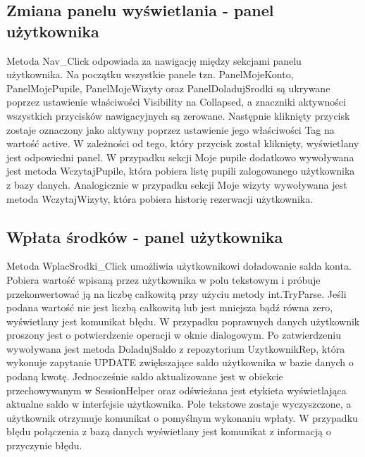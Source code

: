 

\subsection{Zmiana panelu wyświetlania - panel użytkownika}

Metoda Nav\_Click odpowiada za nawigację między sekcjami panelu użytkownika. Na początku wszystkie 
panele tzn. PanelMojeKonto, PanelMojePupile, PanelMojeWizyty oraz PanelDoladujSrodki są ukrywane poprzez 
ustawienie właściwości Visibility na Collapsed, a znaczniki aktywności wszystkich przycisków nawigacyjnych są zerowane. 
Następnie kliknięty przycisk zostaje oznaczony jako aktywny poprzez ustawienie jego właściwości Tag na wartość active. W zależności od 
tego, który przycisk został kliknięty, wyświetlany jest odpowiedni panel. 
W przypadku sekcji Moje pupile dodatkowo wywoływana jest metoda WczytajPupile, która pobiera listę pupili zalogowanego 
użytkownika z bazy danych. Analogicznie w przypadku sekcji Moje wizyty wywoływana jest metoda WczytajWizyty, która pobiera 
historię rezerwacji użytkownika.



\subsection{Wpłata środków - panel użytkownika}

Metoda WplacSrodki\_Click umożliwia użytkownikowi doładowanie salda konta. Pobiera wartość wpisaną przez użytkownika 
w polu tekstowym i próbuje przekonwertować ją na liczbę całkowitą przy użyciu metody int.TryParse. 
Jeśli podana wartość nie jest liczbą całkowitą lub jest mniejsza bądź równa zero, wyświetlany jest komunikat błędu. W przypadku 
poprawnych danych użytkownik proszony jest o potwierdzenie operacji w oknie dialogowym. Po zatwierdzeniu wywoływana jest 
metoda DoladujSaldo z repozytorium UzytkownikRep, która wykonuje zapytanie UPDATE zwiększające saldo 
użytkownika w bazie danych o podaną kwotę. Jednocześnie saldo aktualizowane jest w obiekcie przechowywanym w SessionHelper 
oraz odświeżana jest etykieta wyświetlająca aktualne saldo w interfejsie użytkownika. Pole tekstowe zostaje wyczyszczone, a użytkownik 
otrzymuje komunikat o pomyślnym wykonaniu wpłaty. W przypadku błędu połączenia z bazą danych wyświetlany jest 
komunikat z informacją o przyczynie błędu.


